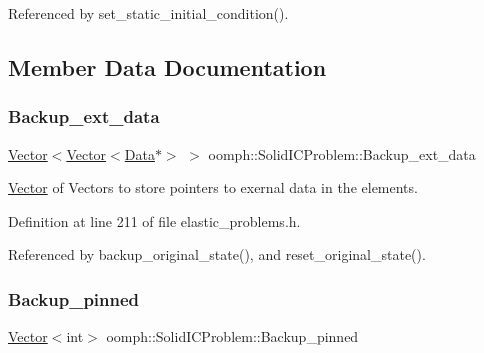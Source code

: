 Referenced by set\+\_\+static\+\_\+initial\+\_\+condition().



\subsection{Member Data Documentation}
\mbox{\label{classoomph_1_1SolidICProblem_a35520128294a9674f62e34750464863a}} 
\subsubsection{\texorpdfstring{Backup\+\_\+ext\+\_\+data}{Backup\_ext\_data}}
{\footnotesize\ttfamily \hyperlink{classoomph_1_1Vector}{Vector}$<$\hyperlink{classoomph_1_1Vector}{Vector}$<$\hyperlink{classoomph_1_1Data}{Data}$\ast$$>$ $>$ oomph\+::\+Solid\+I\+C\+Problem\+::\+Backup\+\_\+ext\+\_\+data\hspace{0.3cm}{\ttfamily [private]}}



\hyperlink{classoomph_1_1Vector}{Vector} of Vectors to store pointers to exernal data in the elements. 



Definition at line 211 of file elastic\+\_\+problems.\+h.



Referenced by backup\+\_\+original\+\_\+state(), and reset\+\_\+original\+\_\+state().

\mbox{\label{classoomph_1_1SolidICProblem_a75eca35ec7eeb8fa9b52dc074b9cb184}} 
\subsubsection{\texorpdfstring{Backup\+\_\+pinned}{Backup\_pinned}}
{\footnotesize\ttfamily \hyperlink{classoomph_1_1Vector}{Vector}$<$int$>$ oomph\+::\+Solid\+I\+C\+Problem\+::\+Backup\+\_\+pinned\hspace{0.3cm}{\ttfamily [private]}}



